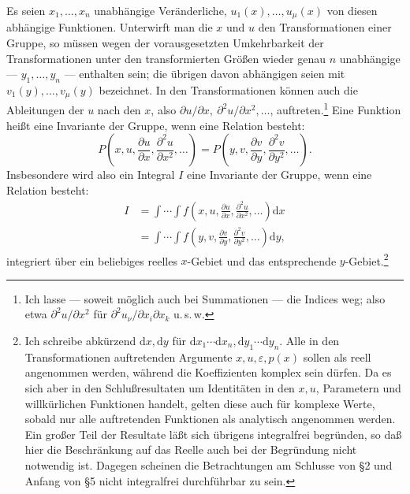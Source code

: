 \documentclass[11pt]{article}
\newcommand{\dd}{\mathrm d}
\newcommand{\eps}{\varepsilon}
\newcommand{\p}{\partial}
\begin{document}
Es seien \(x_1,\ldots,x_n\) unabhängige Veränderliche, \(u_1(x),\ldots,u_\mu(x)\) von diesen abhängige Funktionen. Unterwirft man die \(x\) und \(u\) den Transformationen einer Gruppe, so müssen wegen der vorausgesetzten Umkehrbarkeit der Transformationen unter den transformierten Größen wieder genau \(n\) unabhängige --- \(y_1,\ldots,y_n\) --- enthalten sein; die übrigen davon abhängigen seien mit \(v_1(y),\ldots,v_\mu(y)\) bezeichnet. In den Transformationen können auch die Ableitungen der \(u\) nach den \(x\), also \(\p u/\p x,\ \p^2u/\p x^2,\ldots\), auftreten.\footnote{Ich lasse --- soweit möglich auch bei Summationen --- die Indices weg; also etwa \(\p^2u/\p x^2\) für \(\p^2u_\nu/\p x_i\p x_k\) u.\,s.\,w.} Eine Funktion heißt eine Invariante der Gruppe, wenn eine Relation besteht:
\[
P\!\left(x,u,\frac{\p u}{\p x},\frac{\p^2u}{\p x^2},\ldots\right)
 =
P\!\left(y,v,\frac{\p v}{\p y},\frac{\p^2v}{\p y^2},\ldots\right).
\]
Insbesondere wird also ein Integral \(I\) eine Invariante der Gruppe, wenn eine Relation besteht:
\begin{equation}
\begin{aligned}
I&=\int\!\cdots\!\int f\!\left(x,u,\frac{\p u}{\p x},\frac{\p^2u}{\p x^2},\ldots\right)\dd x\\
 &=\int\!\cdots\!\int f\!\left(y,v,\frac{\p v}{\p y},\frac{\p^2v}{\p y^2},\ldots\right)\dd y,
\end{aligned}
\tag{1}
\end{equation}
integriert über ein beliebiges reelles \(x\)-Gebiet und das entsprechende \(y\)-Gebiet.\footnote{Ich schreibe abkürzend \(\dd x,\dd y\) für \(\dd x_1\cdots \dd x_n,\dd y_1\cdots \dd y_n\). Alle in den Transformationen auftretenden Argumente \(x,u,\eps,p(x)\) sollen als reell angenommen werden, während die Koeffizienten komplex sein dürfen. Da es sich aber in den Schlußresultaten um Identitäten in den \(x,u\), Parametern und willkürlichen Funktionen handelt, gelten diese auch für komplexe Werte, sobald nur alle auftretenden Funktionen als analytisch angenommen werden. Ein großer Teil der Resultate läßt sich übrigens integralfrei begründen, so daß hier die Beschränkung auf das Reelle auch bei der Begründung nicht notwendig ist. Dagegen scheinen die Betrachtungen am Schlusse von \S{}2 und Anfang von \S{}5 nicht integralfrei durchführbar zu sein.}
\end{document}
